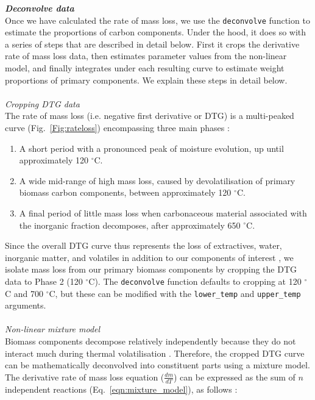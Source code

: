 \documentclass{jors}\usepackage[]{graphicx}\usepackage[]{color}
\begin{document}
\textbf{\textit{Deconvolve data}}\\
Once we have calculated the rate of mass loss, we use the \verb|deconvolve| function to estimate the proportions of carbon components. Under the hood, it does so with a series of steps that are described in detail below. First it crops the derivative rate of mass loss data, then estimates parameter values from the non-linear model, and finally integrates under each resulting curve to estimate weight proportions of primary components. We explain these steps in detail below. \\
\\
\textit{Cropping DTG data}\\
The rate of mass loss (i.e. negative first derivative or DTG) is a multi-peaked curve (Fig.~\ref{Fig:rateloss}) encompassing three main phases \citep{orfao2001}:
\begin{enumerate}
	\item A short period with a pronounced peak of moisture evolution, up until approximately 120 $^{\circ}$C.
	\item A wide mid-range of high mass loss, caused by devolatilisation of primary biomass carbon components, between approximately 120 $^{\circ}$C.
	\item A final period of little mass loss when carbonaceous material associated with the inorganic fraction decomposes, after approximately 650 $^{\circ}$C.
\end{enumerate}
Since the overall DTG curve thus represents the loss of extractives, water, inorganic matter, and volatiles in addition to our components of interest \citep{hu2016}, we isolate mass loss from our primary biomass components by cropping the DTG data to Phase 2 (120 $^{\circ}$C). The \verb|deconvolve| function defaults to cropping at 120 $^{\circ}$C and 700 $^{\circ}$C, but these can be modified with the \verb|lower_temp| and \verb|upper_temp| arguments.\\
\\
\textit{Non-linear mixture model}\\
Biomass components decompose relatively independently because they do not interact much during thermal volatilisation \citep{yang2006}.
Therefore, the cropped DTG curve can be mathematically deconvolved into constituent parts using a mixture model. The derivative rate of mass loss equation ($\frac{dm}{dT}$) can be expressed as the sum of $n$ independent reactions (Eq.~\ref{eqn:mixture_model}), as follows \citep{orfao2001}:
\end{document}
